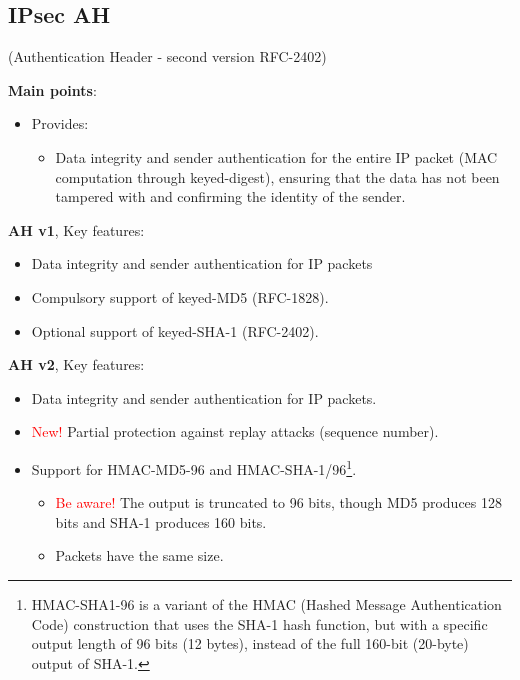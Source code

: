 \subsection{IPsec AH}
\begin{center}
    (Authentication Header - second version RFC-2402)
\end{center}
\textbf{Main points}:
\begin{itemize}
    \item Provides:
    \begin{itemize}
        \item Data integrity and sender authentication for the entire IP packet (MAC computation through keyed-digest), ensuring that the data has not been tampered with and confirming the identity of the sender.
    \end{itemize}
\end{itemize}


\clearpage

\begin{multicols}{2}
    \raggedcolumns
    \textbf{AH v1}, Key features:

    \begin{itemize}
        \item Data integrity and sender authentication for IP packets
        \item Compulsory support of keyed-MD5 (RFC-1828).
        \item Optional support of keyed-SHA-1 (RFC-2402).
    \end{itemize}

\columnbreak

\textbf{AH v2}, Key features:

\begin{itemize}
    \item Data integrity and sender authentication for IP packets.
    \item \textcolor{red}{New!} Partial protection against replay attacks (sequence number).
    \item Support for HMAC-MD5-96 and HMAC-SHA-1/96\footnote{HMAC-SHA1-96 is a variant of the HMAC (Hashed Message Authentication Code) construction that uses the SHA-1 hash function, but with a specific output length of 96 bits (12 bytes), instead of the full 160-bit (20-byte) output of SHA-1.}.
    \begin{itemize}
        \item \textcolor{red}{Be aware! }The output is truncated to 96 bits, though MD5 produces 128 bits and SHA-1 produces 160 bits.
        \item Packets have the same size.
    \end{itemize} 
\end{itemize}
\end{multicols}








